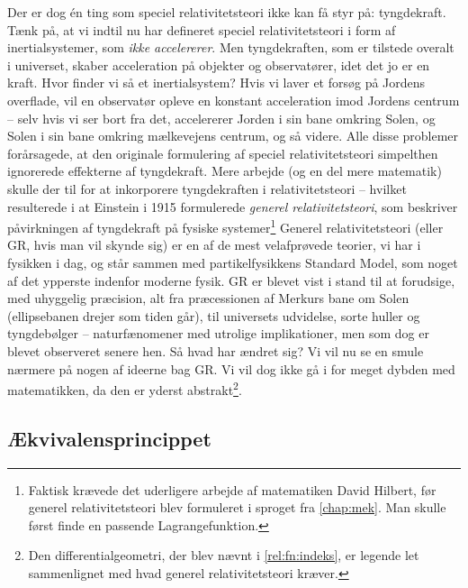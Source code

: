 \documentclass[crop=false, class=memoir]{standalone}
\begin{document}
Der er dog én ting som speciel relativitetsteori ikke kan få styr på: tyngdekraft. Tænk på, at vi indtil nu har defineret speciel relativitetsteori i form af inertialsystemer, som \emph{ikke accelererer}. Men tyngdekraften, som er tilstede overalt i universet, skaber acceleration på objekter og observatører, idet det jo er en kraft. Hvor finder vi så et inertialsystem? Hvis vi laver et forsøg på Jordens overflade, vil en observatør opleve en konstant acceleration imod Jordens centrum -- selv hvis vi ser bort fra det, accelererer Jorden i sin bane omkring Solen, og Solen i sin bane omkring mælkevejens centrum, og så videre. Alle disse problemer forårsagede, at den originale formulering af speciel relativitetsteori simpelthen ignorerede effekterne af tyngdekraft. Mere arbejde (og en del mere matematik) skulle der til for at inkorporere tyngdekraften i relativitetsteori -- hvilket resulterede i at Einstein i 1915 formulerede \emph{generel relativitetsteori}, som beskriver påvirkningen af tyngdekraft på fysiske systemer\footnote{Faktisk krævede det uderligere arbejde af matematiken David Hilbert, før generel relativitetsteori blev formuleret i sproget fra \cref{chap:mek}. Man skulle først finde en passende Lagrangefunktion.} Generel relativitetsteori (eller GR, hvis man vil skynde sig) er en af de mest velafprøvede teorier, vi har i fysikken i dag, og står sammen med partikelfysikkens Standard Model, som noget af det ypperste indenfor moderne fysik. GR er blevet vist i stand til at forudsige, med uhyggelig præcision, alt fra præcessionen af Merkurs bane om Solen (ellipsebanen drejer som tiden går), til universets udvidelse, sorte huller og tyngdebølger -- naturfænomener med utrolige implikationer, men som dog er blevet observeret senere hen. Så hvad har ændret sig? Vi vil nu se en smule nærmere på nogen af ideerne bag GR. Vi vil dog ikke gå i for meget dybden med matematikken, da den er yderst abstrakt\footnote{Den differentialgeometri, der blev nævnt i \cref{rel:fn:indeks}, er legende let sammenlignet med hvad generel relativitetsteori kræver.}.

\subsection{Ækvivalensprincippet}
\end{document}
